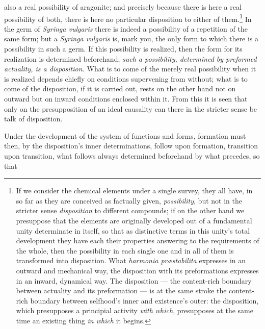\documentclass[12pt,a4paper]{book}
\begin{document}
\setcounter{footnote}{0}
also a real possibility of aragonite; and precisely because there is here a
real possibility of both, there is here no particular disposition to either of
them.\footnote{If we consider the chemical elements under a single survey, they
all have, in so far as they are conceived as factually given,
\emph{possibility}, but not in the stricter sense \emph{disposition} to
different compounds; if on the other hand we presuppose that the elements are
originally developed out of a fundamental unity determinate in itself, so that
as distinctive terms in this unity's total development they have each their
properties answering to the requirements of the whole, then the possibility in
each single one and in all of them is transformed into disposition. What
\textit{harmonia præstabilita} expresses in an outward and mechanical way, the
disposition with its preformations expresses in an inward, dynamical way. The
disposition --- the content-rich boundary between actuality and its
preformation --- is at the same stroke the content-rich boundary between
selfhood's inner and existence's outer: the disposition, which presupposes a
principial activity \emph{with which}, presupposes at the same time an existing
thing \emph{in which} it begins.}
In the germ of \textit{Syringa vulgaris} there is indeed a possibility of a
repetition of the same form; but a \textit{Syringa vulgaris} is, mark you, the
only form to which there is a possibility in such a germ. If this possibility
is realized, then the form for its realization is determined beforehand;
\emph{such a possibility, determined by preformed actuality, is a disposition.}
What is to come of the merely real possibility when it is realized depends
chiefly on conditions supervening from without; what is to come of the
disposition, if it is carried out, rests on the other hand not on outward but
on inward conditions enclosed within it. From this it is seen that only on the
presupposition of an ideal causality can there in the stricter sense be talk of
disposition.

Under the development of the system of functions and forms, formation must
then, by the disposition's inner determinations, follow upon formation,
transition upon transition, what follows always determined beforehand by what
precedes, so that
\end{document}

